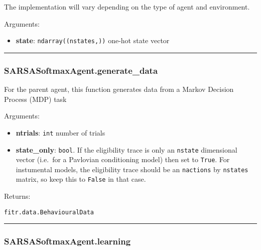 The implementation will vary depending on the type of agent and
environment.

Arguments:

\begin{itemize}
\tightlist
\item
  \textbf{state}: \texttt{ndarray((nstates,))} one-hot state vector
\end{itemize}

\begin{center}\rule{0.5\linewidth}{\linethickness}\end{center}

\subsubsection{SARSASoftmaxAgent.generate\_data}\label{sarsasoftmaxagent.generate_data}

\begin{Shaded}
\begin{Highlighting}[]
\OperatorTok{=}\NormalTok{)}
\end{Highlighting}
\end{Shaded}

For the parent agent, this function generates data from a Markov
Decision Process (MDP) task

Arguments:

\begin{itemize}
\tightlist
\item
  \textbf{ntrials}: \texttt{int} number of trials
\item
  \textbf{state\_only}: \texttt{bool}. If the eligibility trace is only
  an \texttt{nstate} dimensional vector (i.e.~for a Pavlovian
  conditioning model) then set to \texttt{True}. For instumental models,
  the eligibility trace should be an \texttt{nactions} by
  \texttt{nstates} matrix, so keep this to \texttt{False} in that case.
\end{itemize}

Returns:

\texttt{fitr.data.BehaviouralData}

\begin{center}\rule{0.5\linewidth}{\linethickness}\end{center}

\subsubsection{SARSASoftmaxAgent.learning}\label{sarsasoftmaxagent.learning}

